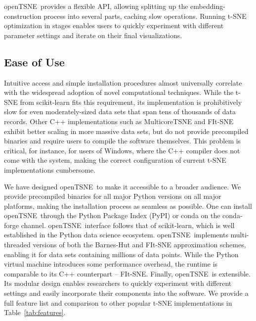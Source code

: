 \documentclass[twocolumn]{bmcart}
\newcommand{\opentsne}{\textsf{openTSNE}}
\begin{document}
\opentsne\ provides a flexible API, allowing splitting up the
embedding-construction process into several parts, caching slow operations.
Running t-SNE optimization in stages enables users to quickly experiment with
different parameter settings and iterate on their final visualizations.

\subsection*{Ease of Use}

Intuitive access and simple installation procedures almost universally correlate
with the widespread adoption of novel computational techniques. While the t-SNE
from \textsf{scikit-learn} fits this requirement, its implementation is
prohibitively slow for even moderately-sized data sets that span tens of
thousands of data records. Other C++ implementations such as
\textsf{MulticoreTSNE} and \textsf{FIt-SNE} exhibit better scaling in more
massive data sets, but do not provide precompiled binaries and require users to
compile the software themselves. This problem is critical, for instance, for
users of Windows, where the C++ compiler does not come with the system, making
the correct configuration of current t-SNE implementations cumbersome.

We have designed \opentsne\ to make it accessible to a broader audience. We
provide precompiled binaries for all major Python versions on all major
platforms, making the installation process as seamless as possible. One can
install \opentsne\ through the Python Package Index (PyPI) or conda on the
conda-forge channel. \opentsne\ interface follows that of \textsf{scikit-learn},
which is well established in the Python data science ecosystem. \opentsne\
implements multi-threaded versions of both the Barnes-Hut and FIt-SNE
approximation schemes, enabling it for data sets containing millions of data
points. While the Python virtual machine introduces some performance overhead,
the runtime is comparable to its C++ counterpart -- \textsf{FIt-SNE}. Finally,
\opentsne\ is extensible. Its modular design enables researchers to quickly
experiment with different settings and easily incorporate their components into
the software. We provide a full feature list and comparison to other popular
t-SNE implementations in Table~\ref{tab:features}.
\end{document}
